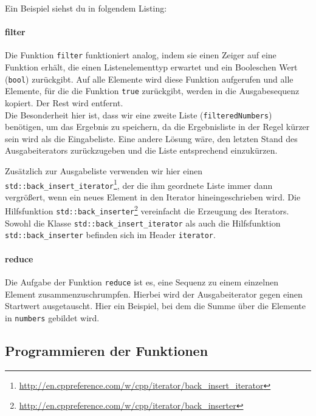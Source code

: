 Ein Beispiel siehst du in folgendem Listing:


\paragraph{filter}
Die Funktion \lstinline{filter} funktioniert analog, indem sie einen Zeiger auf eine Funktion erhält, die einen Listenelementtyp erwartet und ein Booleschen Wert (\lstinline{bool}) zurückgibt.
Auf alle Elemente wird diese Funktion aufgerufen und alle Elemente, für die die Funktion \lstinline{true} zurückgibt, werden in die Ausgabesequenz kopiert. Der Rest wird entfernt. \\
%
%
Die Besonderheit hier ist, dass wir eine zweite Liste (\lstinline|filteredNumbers|) benötigen, um das Ergebnis zu speichern, da die Ergebnisliste in der Regel kürzer sein wird als die Eingabeliste.
Eine andere Lösung wäre, den letzten Stand des Ausgabeiterators zurückzugeben und die Liste entsprechend einzukürzen.

Zusätzlich zur Ausgabeliste verwenden wir hier einen \lstinline|std::back_insert_iterator|\footnote{\url{http://en.cppreference.com/w/cpp/iterator/back_insert_iterator}}, der die ihm geordnete Liste immer dann vergrößert, wenn ein neues Element in den Iterator hineingeschrieben wird.
Die Hilfsfunktion \lstinline|std::back_inserter|\footnote{\url{http://en.cppreference.com/w/cpp/iterator/back_inserter}} vereinfacht die Erzeugung des Iterators.
Sowohl die Klasse \lstinline|std::back_insert_iterator| als auch die Hilfsfunktion \lstinline|std::back_inserter| befinden sich im Header \lstinline|iterator|.

\paragraph{reduce}
Die Aufgabe der Funktion \lstinline{reduce} ist es, eine Sequenz zu einem einzelnen Element zusammenzuschrumpfen.
Hierbei wird der Ausgabeiterator gegen einen Startwert ausgetauscht.
Hier ein Beispiel, bei dem die Summe über die Elemente in \lstinline{numbers} gebildet wird.
%

\subsection{Programmieren der Funktionen}
\label{sec:map-filter-reduce-basic-impl}

